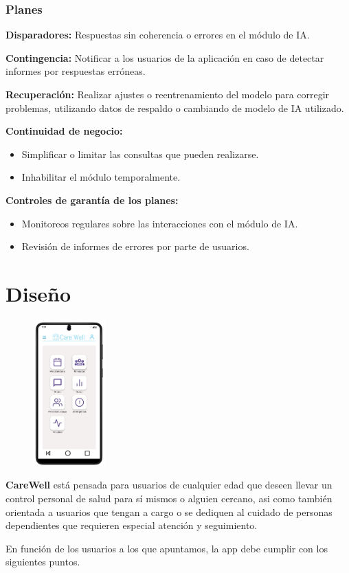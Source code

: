 \documentclass[a4paper,12pt]{article}
\begin{document}
    \subsubsection{Planes}
    \par \textbf{Disparadores:} Respuestas sin coherencia o errores en el módulo de IA.
    \par \textbf{Contingencia:} Notificar a los usuarios de la aplicación en caso de detectar informes por respuestas erróneas.
    \par \textbf{Recuperación:} Realizar ajustes o reentrenamiento del modelo para corregir problemas, utilizando datos de respaldo o cambiando de modelo de IA utilizado.
    \par \textbf{Continuidad de negocio:}
    \begin{itemize}
        \item Simplificar o limitar las consultas que pueden realizarse.
        \item Inhabilitar el módulo temporalmente.
    \end{itemize}
    \par \textbf{Controles de garantía de los planes:}
    \begin{itemize}
        \item Monitoreos regulares sobre las interacciones con el módulo de IA.
        \item Revisión de informes de errores por parte de usuarios.
    \end{itemize}

    \newpage

    \section{Diseño}
    \begin{figure}
        \centering
        \includegraphics[width=0.25\textwidth]{Imagenes/MenuPrincipal.jpg}
    \end{figure}
    \par \textbf{CareWell} está pensada para usuarios de cualquier edad que deseen llevar un control personal de salud para sí mismos o alguien cercano, asi como también orientada a usuarios que tengan a cargo o se dediquen al cuidado de personas dependientes que requieren especial atención y seguimiento.
    \par En función de los usuarios a los que apuntamos, la app debe cumplir con los siguientes puntos.
\end{document}
